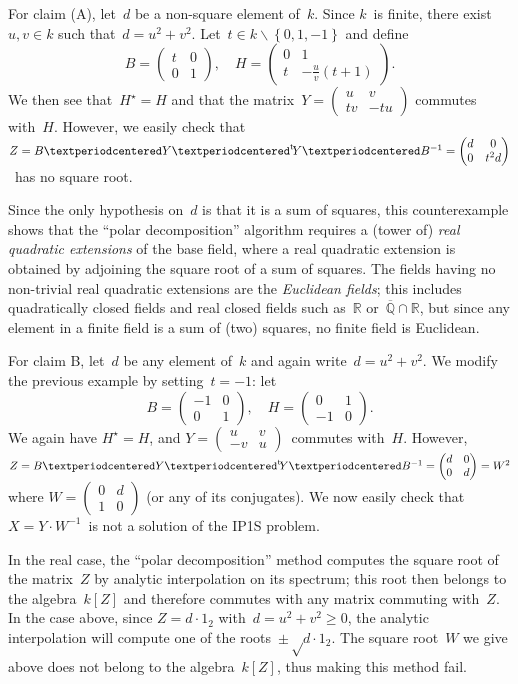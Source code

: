 \documentclass{lms}
\def\transpose#1{{\vphantom{#1}}^{\mathrm{t}}\!#1}
\def\acco#1{\left\{#1\right\}}
\def\mat#1{\begin{pmatrix}#1\end{pmatrix}}
\begin{document}
For claim (A), let~$d$ be a non-square element of~$k$.
Since $k$~is finite, there exist~$u, v ∈ k$ such that~$d = u^2 + v^2$.
Let~$t ∈ k ∖ \acco {0, 1, -1}$ and define
\[ B = \mat{t & 0 \\ 0 & 1}, \quad
H = \mat{0 & 1 \\ t & -\frac{u}{v}(t+1)}. \]
We then see that~$H^{⋆} = H$ and that
the matrix~$Y = \mat{u & v \\ t v & -t u}$ commutes with~$H$.
However, we easily check that
$Z = B · Y · \transpose{Y} · B^{-1} = \mat{d & 0 \\ 0 & t^2 d}$~has no square
root.

Since the only hypothesis on~$d$ is that it is a sum of squares,
this counterexample shows that the ``polar decomposition'' algorithm
requires a (tower of) \emph{real quadratic extensions} of the base field,
where a real quadratic extension is obtained by adjoining
the square root of a sum of squares.
The fields having no non-trivial real quadratic extensions
are the \emph{Euclidean fields};
this includes quadratically closed fields
and real closed fields such as~$ℝ$ or~$\overline{ℚ} ∩ ℝ$,
but since any element in a finite field is a sum of (two) squares,
no finite field is Euclidean.

\medskip

For claim B, let~$d$ be any element of~$k$ and again write~$d = u^2 + v^2$.
We modify the previous example by setting~$t = -1$: let
\[ B = \mat{-1 & 0 \\ 0 & 1}, \quad
H = \mat{0 & 1 \\ -1 & 0}. \]
We again have $H^{⋆} = H$, and $Y = \mat{u & v\\-v & u}$~commutes
with~$H$.
However, $Z = B · Y · \transpose{Y} · B^{-1} = \mat{d & 0 \\ 0 & d} = W^2$
where $W = \mat{0 & d \\ 1 & 0}$ (or any of its conjugates).
We now easily check that
$X = Y · W^{-1}$~is not a solution of the IP1S problem.

In the real case, the ``polar decomposition'' method computes the
square root of the matrix~$Z$ by analytic interpolation on its spectrum;
this root then belongs to the algebra~$k[Z]$
and therefore commutes with any matrix commuting with~$Z$.
In the case above, since $Z = d · 1_{2}$ with~$d = u^2 + v^2 ≥ 0$,
the analytic interpolation will compute one of the roots~$±√{d} · 1_2$.
The square root~$W$ we give above does not belong to the algebra~$k[Z]$,
thus making this method fail.
\end{document}
